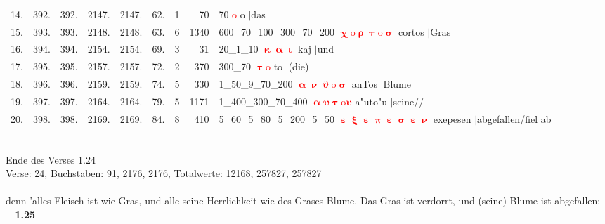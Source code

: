 \documentclass[a4paper,10pt,landscape]{article}
\begin{document}
\begin{tabular}{rrrrrrrrp{120mm}}
14.&392.&392.&2147.&2147.&62.&1&70&70 \textcolor{red}{$\boldsymbol{\mathrm{o}}$} o $|$das\\
15.&393.&393.&2148.&2148.&63.&6&1340&600\_70\_100\_300\_70\_200 \textcolor{red}{$\boldsymbol{\upchi\mathrm{o}\uprho\uptau\mathrm{o}\upsigma}$} cortos $|$Gras\\
16.&394.&394.&2154.&2154.&69.&3&31&20\_1\_10 \textcolor{red}{$\boldsymbol{\upkappa\upalpha\upiota}$} kaj $|$und\\
17.&395.&395.&2157.&2157.&72.&2&370&300\_70 \textcolor{red}{$\boldsymbol{\uptau\mathrm{o}}$} to $|$(die)\\
18.&396.&396.&2159.&2159.&74.&5&330&1\_50\_9\_70\_200 \textcolor{red}{$\boldsymbol{\upalpha\upnu\upvartheta\mathrm{o}\upsigma}$} anTos $|$Blume\\
19.&397.&397.&2164.&2164.&79.&5&1171&1\_400\_300\_70\_400 \textcolor{red}{$\boldsymbol{\upalpha\upsilon\uptau\mathrm{o}\upsilon}$} a"uto"u $|$seine//\\
20.&398.&398.&2169.&2169.&84.&8&410&5\_60\_5\_80\_5\_200\_5\_50 \textcolor{red}{$\boldsymbol{\upepsilon\upxi\upepsilon\uppi\upepsilon\upsigma\upepsilon\upnu}$} exepesen $|$abgefallen/fiel ab\\
\end{tabular}\medskip \\
Ende des Verses 1.24\\
Verse: 24, Buchstaben: 91, 2176, 2176, Totalwerte: 12168, 257827, 257827\\
\\
denn 'alles Fleisch ist wie Gras, und alle seine Herrlichkeit wie des Grases Blume. Das Gras ist verdorrt, und (seine) Blume ist abgefallen;\\
\newpage 
{\bf -- 1.25}\\
\medskip \\
\end{document}
